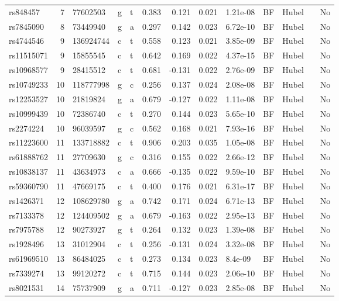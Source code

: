 \documentclass[11pt,twoside]{bristolthesis}
\begin{document}
\begin{longtable}[t]{lrlllrrrlllll}
rs848457 & 7 & 77602503 & g & t & 0.383 & 0.121 & 0.021 & 1.21e-08 & BF & Hubel &  & No\\
rs7845090 & 8 & 73449940 & g & a & 0.297 & 0.142 & 0.023 & 6.72e-10 & BF & Hubel &  & No\\
rs4744546 & 9 & 136924744 & c & t & 0.558 & 0.123 & 0.021 & 3.85e-09 & BF & Hubel &  & No\\
\addlinespace
rs11515071 & 9 & 15855545 & c & t & 0.642 & 0.169 & 0.022 & 4.37e-15 & BF & Hubel &  & No\\
rs10968577 & 9 & 28415512 & c & t & 0.681 & -0.131 & 0.022 & 2.76e-09 & BF & Hubel &  & No\\
rs10749233 & 10 & 118777998 & g & c & 0.256 & 0.137 & 0.024 & 2.08e-08 & BF & Hubel &  & No\\
rs12253527 & 10 & 21819824 & g & a & 0.679 & -0.127 & 0.022 & 1.11e-08 & BF & Hubel &  & No\\
rs10999439 & 10 & 72386740 & c & t & 0.270 & 0.144 & 0.023 & 5.65e-10 & BF & Hubel &  & No\\
\addlinespace
rs2274224 & 10 & 96039597 & g & c & 0.562 & 0.168 & 0.021 & 7.93e-16 & BF & Hubel &  & No\\
rs11223600 & 11 & 133718882 & c & t & 0.906 & 0.203 & 0.035 & 1.05e-08 & BF & Hubel &  & No\\
rs61888762 & 11 & 27709630 & g & c & 0.316 & 0.155 & 0.022 & 2.66e-12 & BF & Hubel &  & No\\
rs10838137 & 11 & 43634973 & c & a & 0.666 & -0.135 & 0.022 & 9.59e-10 & BF & Hubel &  & No\\
rs59360790 & 11 & 47669175 & c & t & 0.400 & 0.176 & 0.021 & 6.31e-17 & BF & Hubel &  & No\\
\addlinespace
rs1426371 & 12 & 108629780 & g & a & 0.742 & 0.171 & 0.024 & 6.71e-13 & BF & Hubel &  & No\\
rs7133378 & 12 & 124409502 & g & a & 0.679 & -0.163 & 0.022 & 2.95e-13 & BF & Hubel &  & No\\
rs7975788 & 12 & 90273927 & g & t & 0.264 & 0.132 & 0.023 & 1.39e-08 & BF & Hubel &  & No\\
rs1928496 & 13 & 31012904 & c & t & 0.256 & -0.131 & 0.024 & 3.32e-08 & BF & Hubel &  & No\\
rs61969510 & 13 & 86484025 & c & t & 0.273 & 0.134 & 0.023 & 8.4e-09 & BF & Hubel &  & No\\
\addlinespace
rs7339274 & 13 & 99120272 & c & t & 0.715 & 0.144 & 0.023 & 2.06e-10 & BF & Hubel &  & No\\
rs8021531 & 14 & 75737909 & g & a & 0.711 & -0.127 & 0.023 & 2.85e-08 & BF & Hubel &  & No\\

\end{longtable}
\end{document}
